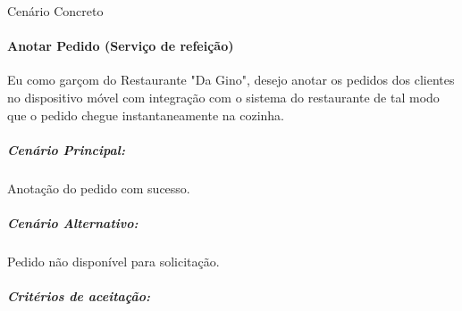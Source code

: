 \begin{itemize}
\begin{description}
  \item [Cenário Concreto]

\end{description}

\end{itemize}

\paragraph{Anotar Pedido (Serviço de refeição)}

Eu como garçom do Restaurante "Da Gino", desejo anotar os pedidos dos clientes no dispositivo móvel com integração com o sistema do restaurante de tal modo que o pedido chegue instantaneamente na cozinha.

\subparagraph{Cenário Principal:}

Anotação do pedido com sucesso.

\subparagraph{Cenário Alternativo:}

Pedido não disponível para solicitação.

\subparagraph{Critérios de aceitação:}

